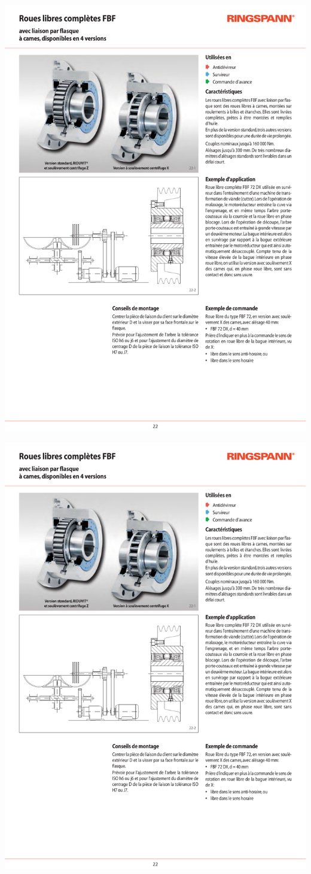 \documentclass[10pt]{article}
\begin{document}
\begin{center}
\includegraphics[page=1,width=.95\textwidth]{images/rouelibre_Ringspann_02}

\includegraphics[page=2,width=.95\textwidth]{images/rouelibre_Ringspann_02}
\end{center}
\end{document}
